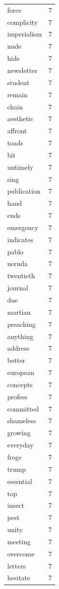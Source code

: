 \begin{tabular}{lr}
force & 7 \\
complicity & 7 \\
imperialism & 7 \\
nude & 7 \\
hide & 7 \\
newsletter & 7 \\
student & 7 \\
remain & 7 \\
chain & 7 \\
aesthetic & 7 \\
affront & 7 \\
toads & 7 \\
bit & 7 \\
untimely & 7 \\
sing & 7 \\
publication & 7 \\
hand & 7 \\
ends & 7 \\
emergency & 7 \\
indicates & 7 \\
pablo & 7 \\
neruda & 7 \\
twentieth & 7 \\
journal & 7 \\
due & 7 \\
martian & 7 \\
preaching & 7 \\
anything & 7 \\
address & 7 \\
better & 7 \\
european & 7 \\
concepts & 7 \\
profess & 7 \\
committed & 7 \\
shameless & 7 \\
growing & 7 \\
everyday & 7 \\
frogs & 7 \\
trump & 7 \\
essential & 7 \\
top & 7 \\
insect & 7 \\
pest & 7 \\
unity & 7 \\
meeting & 7 \\
overcome & 7 \\
letters & 7 \\
hesitate & 7 \\

\end{tabular}
